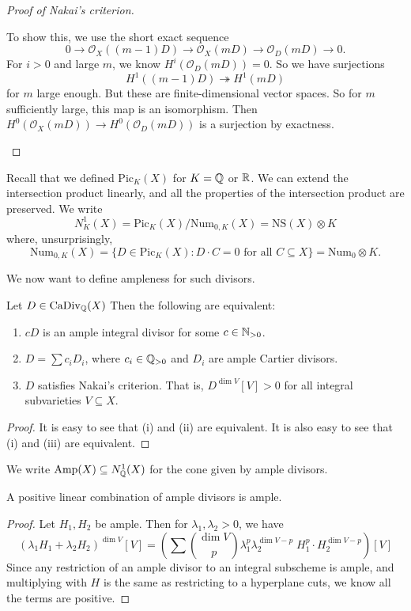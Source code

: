 \documentclass[a4paper]{article}
\newcommand\CaDiv{\mathrm{CaDiv}}
\newcommand\Pic{\mathrm{Pic}}
\newcommand\Num{\mathrm{Num}}
\newcommand\Amp{\mathrm{Amp}}
\newcommand\NS{\mathrm{NS}}
\begin{document}
\begin{proof}[Proof of Nakai's criterion]
\begin{itemize}
      To show this, we use the short exact sequence
      \[
        0 \to \mathcal{O}_X((m - 1)D) \to \mathcal{O}_X(mD) \to \mathcal{O}_D(mD) \to 0.
      \]
      For $i > 0$ and large $m$, we know $H^i(\mathcal{O}_D(mD)) = 0$. So we have surjections
      \[
        H^1((m - 1)D) \twoheadrightarrow H^1(mD)
      \]
      for $m$ large enough. But these are finite-dimensional vector spaces. So for $m$ sufficiently large, this map is an isomorphism. Then $H^0(\mathcal{O}_X(mD)) \to H^0(\mathcal{O}_D(mD))$ is a surjection by exactness.\qedhere
  \end{itemize}
\end{proof}

Recall that we defined $\Pic_K(X)$ for $K = \mathbb{Q}$ or $\mathbb{R}$. We can extend the intersection product linearly, and all the properties of the intersection product are preserved. We write
\[
  N^1_K(X) = \Pic_K(X) / \Num_{0, K}(X) = \NS(X) \otimes K
\]
where, unsurprisingly,
\[
  \Num_{0, K}(X) = \{D \in \Pic_K(X): D \cdot C = 0\text{ for all }C \subseteq X\} = \Num_0 \otimes K.
\]

We now want to define ampleness for such divisors.

\begin{prop}
  Let $D \in \CaDiv_\Q(X)$ Then the following are equivalent:
  \begin{enumerate}
    \item $cD$ is an ample integral divisor for some $c \in \mathbb{N}_{>0}$.
    \item $D = \sum c_i D_i$, where $c_i \in \mathbb{Q}_{>0}$ and $D_i$ are ample Cartier divisors.
    \item $D$ satisfies Nakai's criterion. That is, $D^{\dim V} [V] > 0$ for all integral subvarieties $V \subseteq X$.
  \end{enumerate}
\end{prop}

\begin{proof}
  It is easy to see that (i) and (ii) are equivalent. It is also easy to see that (i) and (iii) are equivalent.
\end{proof}

We write $\Amp(X) \subseteq N_\Q^1(X)$ for the cone given by ample divisors.

\begin{lemma}
  A positive linear combination of ample divisors is ample.
\end{lemma}

\begin{proof}
  Let $H_1, H_2$ be ample. Then for $\lambda_1, \lambda_2 > 0$, we have
  \[
    (\lambda_1 H_1 + \lambda_2 H_2)^{\dim V}[V] = \left(\sum \binom{\dim V}{p} \lambda_1^p \lambda_2^{\dim V - p}\; H_1^p \cdot H_2^{\dim V - p}\right)[V]
  \]
  Since any restriction of an ample divisor to an integral subscheme is ample, and multiplying with $H$ is the same as restricting to a hyperplane cuts, we know all the terms are positive.
\end{proof}
\end{document}
